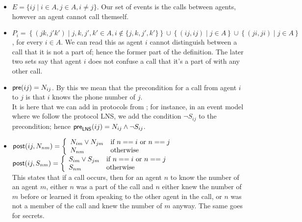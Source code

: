 \documentclass[12pt, a4paper]{article}
\begin{document}
\begin{itemize}
\item $E = \{ij \mid i \in A, j \in A, i \not = j\}$. Our set of events is the
  calls between agents, however an agent cannot call themself. 
\item $P_i = \left\{(jk, j'k') \mid j, k, j', k' \in A, i \not \in \{j, k, j',
    k'\}\right\} \cup \left\{ (ij, ij) \mid j \in A\right\} \cup \left\{ (ji,
    ji) \mid j \in A \right\}$, for every $i \in A$. We can read this as agent
  $i$ cannot distinguish between a call that it is not a part of; hence the
  former part of the definition. The later two sets say that agent $i$ does not
  confuse a call that it's a part of with any other call. 
\item $\textsf{pre}(ij) = N_{ij}$. By this we mean that the precondition for a call from
  agent $i$ to $j$ is that $i$ knows the phone number of $j$. \\
  It is here that we
  can add in protocols from ; for instance, in an event
  model where we follow the protocol \textsf{LNS}, we add the condition $\neg
  S_{ij}$ to the precondition; hence $\textsf{pre}_{\textsf{LNS}}(ij) = N_{ij} \land
  \neg S_{ij}$.
\item $\textsf{post}(ij, N_{nm}) = \left\{ \begin{array}{ll}
                                     N_{im} \lor N_{jm} & \text{if $n == i$ or $n ==
                                                     j$} \\
                                     N_{nm} & \text{otherwise} 
                                   \end{array}
                           \right.$ \\
$\textsf{post}(ij, S_{nm}) = \left\{ \begin{array}{ll}
                                     S_{im} \lor S_{jm} & \text{if $n == i$ or $n ==
                                                     j$} \\
                                     S_{nm} & \text{otherwise} 
                                   \end{array}
                           \right.$ \\
 This states that if a call occurs, then for an agent $n$ to know the number of
 an agent $m$, either $n$ was a part of the call and $n$ either knew the number
 of $m$ before or learned it from speaking to the other agent in the call, or
 $n$ was not a member of the call and knew the number of $m$ anyway. The same
 goes for secrets. 
\end{itemize}
\end{document}
